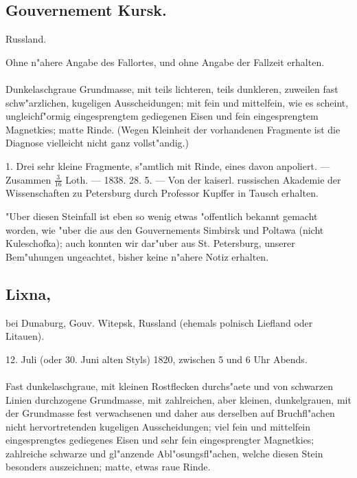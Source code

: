 \documentclass[a4paper, 11pt, oneside, polutonikogreek, german]{article}
\begin{document}
\subsection{Gouvernement Kursk.}
\begin{center}
\small
Russland.

Ohne n"ahere Angabe des Fallortes, und ohne Angabe der Fallzeit erhalten.
\end{center}
\paragraph{}
Dunkelaschgraue Grundmasse, mit teils lichteren, teils dunkleren, zuweilen fast schw"arzlichen, kugeligen Ausscheidungen; mit fein und mittelfein, wie es scheint, ungleichf"ormig eingesprengtem gediegenen Eisen und fein eingesprengtem Magnetkies; matte Rinde. (Wegen Kleinheit der vorhandenen Fragmente ist die Diagnose vielleicht nicht ganz vollst"andig.)

1. Drei sehr kleine Fragmente, s"amtlich mit Rinde, eines davon anpoliert. --- Zusammen $\frac{3}{16}$ Loth. --- 1838. 28. 5. --- Von der kaiserl. russischen Akademie der Wissenschaften zu Petersburg durch Professor Kupffer in Tausch erhalten.

\setlength{\leftskip}{10mm}
\setlength{\parindent}{0pt}

{\footnotesize "Uber diesen Steinfall ist eben so wenig etwas "offentlich bekannt gemacht worden, wie "uber die aus den Gouvernements Simbirsk und Poltawa (nicht Kuleschofka); auch konnten wir dar"uber aus St. Petersburg, unserer Bem"uhungen ungeachtet, bisher keine n"ahere Notiz erhalten.}

\setlength{\leftskip}{0pt}
\setlength{\parindent}{20pt}

\subsection[Lixna.]{Lixna,}
\begin{center}
\small
bei Dunaburg, Gouv. Witepsk, Russland (ehemals polnisch Liefland oder Litauen).

12. Juli (oder 30. Juni alten Styls) 1820, zwischen 5 und 6 Uhr Abends.
\end{center}
\paragraph{}
Fast dunkelaschgraue, mit kleinen Rostflecken durchs"aete und von schwarzen Linien durchzogene Grundmasse, mit zahlreichen, aber kleinen, dunkelgrauen, mit der Grundmasse fest verwachsenen und daher aus derselben auf Bruchfl"achen nicht hervortretenden kugeligen Ausscheidungen; viel fein und mittelfein eingesprengtes gediegenes Eisen und sehr fein eingesprengter Magnetkies; zahlreiche schwarze und gl"anzende Abl"osungsfl"achen, welche diesen Stein besonders auszeichnen; matte, etwas raue Rinde.
\end{document}
